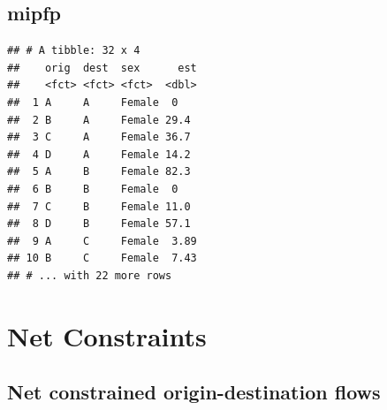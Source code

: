 \documentclass[
]{book}
\newenvironment{Shaded}{\begin{snugshade}}{\end{snugshade}}
\newcommand{\AttributeTok}[1]{\textcolor[rgb]{0.77,0.63,0.00}{#1}}
\newcommand{\FunctionTok}[1]{\textcolor[rgb]{0.00,0.00,0.00}{#1}}
\newcommand{\NormalTok}[1]{#1}
\newcommand{\SpecialCharTok}[1]{\textcolor[rgb]{0.00,0.00,0.00}{#1}}
\newcommand{\StringTok}[1]{\textcolor[rgb]{0.31,0.60,0.02}{#1}}
\begin{document}
\hypertarget{mipfp-8}{%
\subsection{mipfp}\label{mipfp-8}}

\begin{Shaded}
\end{Shaded}

\begin{verbatim}
## # A tibble: 32 x 4
##    orig  dest  sex      est
##    <fct> <fct> <fct>  <dbl>
##  1 A     A     Female  0   
##  2 B     A     Female 29.4 
##  3 C     A     Female 36.7 
##  4 D     A     Female 14.2 
##  5 A     B     Female 82.3 
##  6 B     B     Female  0   
##  7 C     B     Female 11.0 
##  8 D     B     Female 57.1 
##  9 A     C     Female  3.89
## 10 B     C     Female  7.43
## # ... with 22 more rows
\end{verbatim}

\hypertarget{net-constraints}{%
\section{Net Constraints}\label{net-constraints}}

\hypertarget{net-constrained-origin-destination-flows}{%
\subsection{Net constrained origin-destination flows}\label{net-constrained-origin-destination-flows}}
\end{document}
